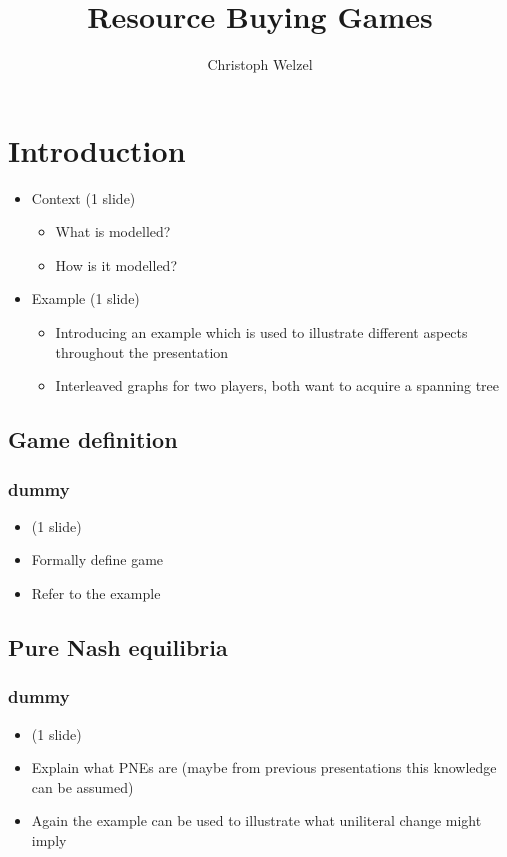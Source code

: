 \documentclass{beamer}
\title{Resource Buying Games}
\author[C. Welzel]{Christoph Welzel}
\newcommand{\ft}{\frametitle{dummy}}
\begin{document}
\maketitle
\section{Introduction}
\begin{frame}
  \begin{itemize}
    \item Context (1 slide)
      \begin{itemize}
        \item What is modelled?
        \item How is it modelled?
      \end{itemize}
    \item Example (1 slide)
      \begin{itemize}
        \item Introducing an example which is used to illustrate different
          aspects throughout the presentation
        \item Interleaved graphs for two players, both want to acquire a
          spanning tree
      \end{itemize}
  \end{itemize}
\end{frame}

\subsection{Game definition}
\begin{frame}
  \ft
  \begin{itemize}
    \item (1 slide)
    \item Formally define game
    \item Refer to the example
  \end{itemize}
\end{frame}
\subsection{Pure Nash equilibria}
\begin{frame}
  \ft
  \begin{itemize}
    \item (1 slide)
    \item Explain what PNEs are (maybe from previous presentations this
      knowledge can be assumed)
    \item Again the example can be used to illustrate what uniliteral change
      might imply
  \end{itemize}
\end{frame}
\end{document}

